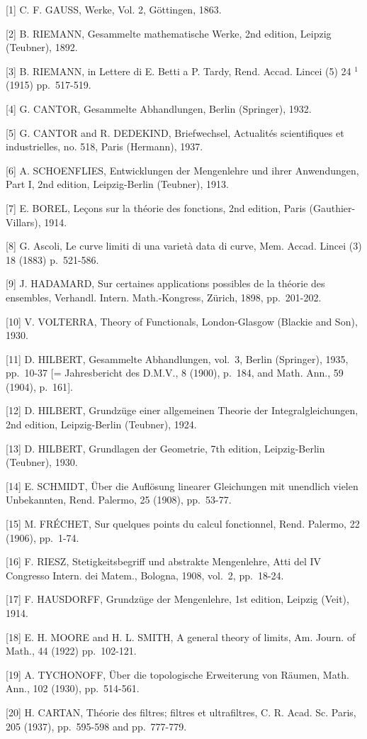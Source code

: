 
{[}1{]} C. F. GAUSS, Werke, Vol. 2, Göttingen, 1863.

{[}2{]} B. RIEMANN, Gesammelte mathematische Werke, 2nd edition, Leipzig (Teubner), 1892.

{[}3{]} B. RIEMANN, in Lettere di E. Betti a P. Tardy, Rend. Accad. Lincei (5) 24 \(^{1}\) (1915) pp.~517-519.

{[}4{]} G. CANTOR, Gesammelte Abhandlungen, Berlin (Springer), 1932.

{[}5{]} G. CANTOR and R. DEDEKIND, Briefwechsel, Actualités scientifiques et industrielles, no. 518, Paris (Hermann), 1937.

{[}6{]} A. SCHOENFLIES, Entwicklungen der Mengenlehre und ihrer Anwendungen, Part I, 2nd edition, Leipzig-Berlin (Teubner), 1913.

{[}7{]} E. BOREL, Leçons sur la théorie des fonctions, 2nd edition, Paris (Gauthier-Villars), 1914.

{[}8{]} G. Ascoli, Le curve limiti di una varietà data di curve, Mem. Accad. Lincei (3) 18 (1883) p.~521-586.

{[}9{]} J. HADAMARD, Sur certaines applications possibles de la théorie des ensembles, Verhandl. Intern. Math.-Kongress, Zürich, 1898, pp.~201-202.

{[}10{]} V. VOLTERRA, Theory of Functionals, London-Glasgow (Blackie and Son), 1930.

{[}11{]} D. HILBERT, Gesammelte Abhandlungen, vol.~3, Berlin (Springer), 1935, pp.~10-37 {[}= Jahresbericht des D.M.V., 8 (1900), p.~184, and Math. Ann., 59 (1904), p.~161{]}.

{[}12{]} D. HILBERT, Grundzüge einer allgemeinen Theorie der Integralgleichungen, 2nd edition, Leipzig-Berlin (Teubner), 1924.

{[}13{]} D. HILBERT, Grundlagen der Geometrie, 7th edition, Leipzig-Berlin (Teubner), 1930.

{[}14{]} E. SCHMIDT, Über die Auflösung linearer Gleichungen mit unendlich vielen Unbekannten, Rend. Palermo, 25 (1908), pp.~53-77.

{[}15{]} M. FRÉCHET, Sur quelques points du calcul fonctionnel, Rend. Palermo, 22 (1906), pp.~1-74.

{[}16{]} F. RIESZ, Stetigkeitsbegriff und abstrakte Mengenlehre, Atti del IV Congresso Intern. dei Matem., Bologna, 1908, vol.~2, pp.~18-24.

{[}17{]} F. HAUSDORFF, Grundzüge der Mengenlehre, 1st edition, Leipzig (Veit), 1914.

{[}18{]} E. H. MOORE and H. L. SMITH, A general theory of limits, Am. Journ. of Math., 44 (1922) pp.~102-121.

{[}19{]} A. TYCHONOFF, Über die topologische Erweiterung von Räumen, Math. Ann., 102 (1930), pp.~514-561.

{[}20{]} H. CARTAN, Théorie des filtres; filtres et ultrafiltres, C. R. Acad. Sc. Paris, 205 (1937), pp.~595-598 and pp.~777-779.

